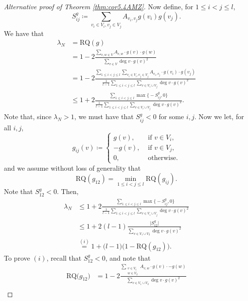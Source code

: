 \documentclass{article}
\newcommand{\RQ}{\textrm{RQ}}
\theoremstyle{plain}
\newcommand\ddfrac[2]{\frac{\displaystyle #1}{\displaystyle #2}}
\theoremstyle{definition}
\theoremstyle{remark}
\begin{document}
\begin{proof}[Alternative proof of Theorem \ref{thm:cor5.4AMZ}]
    Now define, for $1\leq i<j\leq  l$,
    \begin{equation}\label{eq:S_ij}
    S_{ij}^g\coloneqq  \sum_{v_i\in V_i, v_j\in V_j}A_{v_i,v_j}g(v_i)g(v_j).
    \end{equation}
    We have that
    \begin{align*}
        \lambda_N &= \RQ(g) \\&= 1 - 2\ddfrac{\sum_{v,w\in V}A_{v,w}\cdot g(v)\cdot g(w)}{\sum_{v\in V}\deg v\cdot g(v)^2}\\
        &= 1 - 2\ddfrac{\sum_{1\leq i<j\leq  l}\sum_{v_i\in V_i,v_j\in V_j}A_{v_i,v_j}\cdot g(v_i)\cdot g(v_j)}{\frac1{ l-1}\sum_{1\leq i< j\leq  l}\sum_{v\in V_i\cup V_j}\deg v \cdot g(v)^2}\\
        &\leq 1 + 2\ddfrac{\sum_{1\leq i<j\leq  l}\max\biggl\{-S^g_{ij},0\biggr\}}{\frac1{ l-1}\sum_{1\leq i< j\leq  l}\sum_{v\in V_i\cup V_j}\deg v \cdot g(v)^2}.
    \end{align*}
    Note that, since  $\lambda_N>1$, we must have that $S^g_{ij}< 0$ for some $i,j$. Now we let, for all $i,j$,
     \begin{equation}\label{eq:g_ij}
     g_{ij}(v)\coloneqq \begin{cases}
        g(v), &\text{ if } v\in V_i,\\
        -g(v), &\text{ if } v\in V_j,\\
        0, &\text{ otherwise.}
    \end{cases}
    \end{equation}
    and we assume without loss of generality that
    \[
    \RQ(g_{12}) = \min_{1\leq i<j\leq  l} \RQ( g_{ij}).
    \]
    Note that $S_{12}^g<0$.
    Then,
    \begin{align*}
        \lambda_N &\leq 1 + 2\ddfrac{\sum_{1\leq i<j\leq  l}\max\biggl\{-S^g_{ij},0\biggr\}}{\frac1{ l-1}\sum_{1\leq i< j\leq  l}\sum_{v\in V_i\cup V_j}\deg v \cdot g(v)^2}\\
        &\leq 1 + 2( l-1)\ddfrac{\bigl|S^g_{12}\bigr|}{\sum_{v\in V_1\cup V_2}\deg v \cdot g(v)^2}\\
        &\overset{(i)}{=} 1+\bigl( l-1\bigr)\bigl(1-\RQ(g_{12})\bigr).
    \end{align*}
    To prove $(i)$, recall that $S_{12}^g<0$, and note that
    \begin{align*}
        \RQ\bigl(g_{12}\bigr) &= 1 -2\frac{\sum_{\substack{v\in V_1\\ w\in V_2}}A_{v,w}\cdot g(v)\cdot -g(w)}{\sum_{v\in V_1\cup V_2}\deg v\cdot g(v)^2}\\

\end{align*}
\end{proof}
\end{document}
